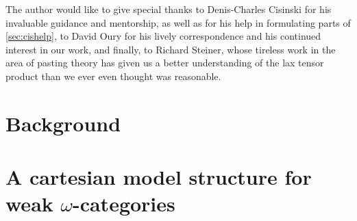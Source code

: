 \documentclass{amsbook}
\theoremstyle{plain}   %
\theoremstyle{remark}
\theoremstyle{plain}
\numberwithin{section}{chapter}
\begin{document}
The author would like to give special thanks to Denis-Charles Cisinski for his invaluable guidance and mentorship, as well as for his help in formulating parts of \eqref{sec:cishelp}, to David Oury for his lively correspondence and his continued interest in our work, and finally, to Richard Steiner, whose tireless work in the area of pasting theory has given us a better understanding of the lax tensor product than we ever even thought was reasonable.  


\mainmatter
\chapter{Background}

\chapter{A cartesian model structure for weak $\omega$-categories}

\end{document}
